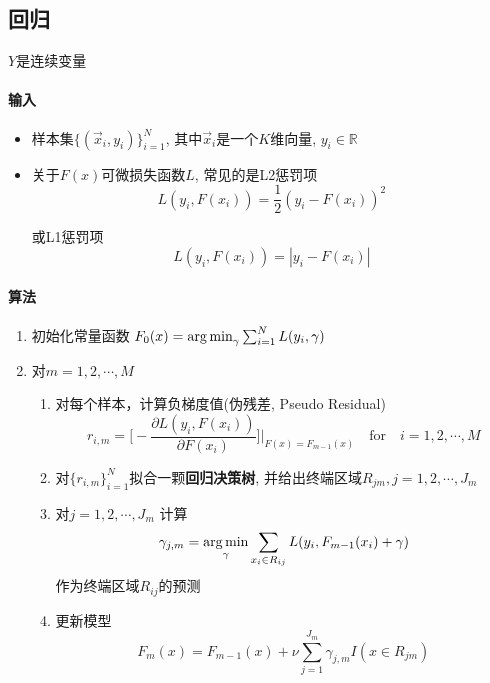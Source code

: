 \subsection{回归}

$Y$是连续变量

\paragraph{输入}

\begin{itemize}
    \item 样本集$\{(\vec{x}_i, y_i)\}_{i=1}^N$, 其中$\vec{x}_i$是一个$K$维向量, $y_i\in \mathbb{R} $
    \item 关于$F(x)$可微损失函数$L$, 常见的是L2惩罚项
          \begin{equation*}
              L(y_i, F(x_i)) = \frac{1}{2}(y_i - F(x_i))^2
          \end{equation*}

          或L1惩罚项
          \begin{equation*}
              L(y_i, F(x_i)) = |y_i - F(x_i)|
          \end{equation*}

\end{itemize}

\paragraph{算法}

\begin{enumerate}
    \item 初始化常量函数 $F_0(x) = \operatorname*{arg\,min}_\gamma \sum_{i=1}^NL(y_i, \gamma)$
    \item 对$m=1,2,\cdots, M$
          \begin{enumerate}
              \item 对每个样本，计算负梯度值(伪残差, Pseudo Residual)
                    \begin{equation*}
                        r_{i,m} = \Bigg[-\frac{\partial L(y_i, F(x_i))}{\partial F(x_i)}\Bigg]\Bigg|_{F(x)=F_{m-1}(x)} \quad \text{for} \quad i=1,2,\cdots,M
                    \end{equation*}
              \item 对$\{r_{i,m}\}_{i=1}^N$拟合一颗\textbf{回归决策树}, 并给出终端区域$R_{jm}, j=1,2,\cdots,J_m$
              \item 对$j=1,2,\cdots, J_m$ 计算
                    \begin{equation}\label{opt_gbdt_reg_reg_dt}
                        \gamma_{j,m} = \operatorname*{arg\,min}_{\gamma} \sum_{x_i\in R_{ij}}L(y_i, F_{m-1}(x_i) + \gamma)
                    \end{equation}
                    作为终端区域$R_{ij}$的预测
              \item 更新模型
                    \begin{equation*}
                        F_m(x) = F_{m-1}(x) + \nu \sum_{j=1}^{J_m}\gamma_{j,m}I(x\in R_{jm})
                    \end{equation*}
          \end{enumerate}
\end{enumerate}


